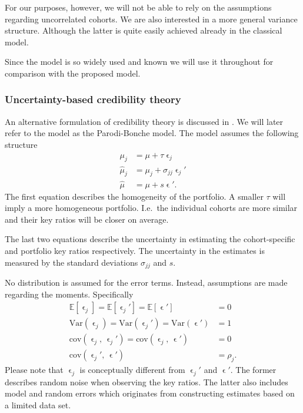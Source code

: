 \documentclass[11pt]{article}
\theoremstyle{definition}
\begin{document}
For our purposes, however, we will not be able to rely on the assumptions regarding uncorrelated cohorts. We are also interested in a more general variance structure. Although the latter is quite easily achieved already in the classical model.

Since the model is so widely used and known we will use it throughout for comparison with the proposed model.

\subsubsection{Uncertainty-based credibility theory}
An alternative formulation of credibility theory is discussed in \cite{parodi}. We will later refer to the model as the Parodi-Bonche model. The model assumes the following structure
\begin{equation*}
    \begin{aligned}
        \mu_j &= \mu + \tau\upvarepsilon_{j} \\
        \hat\mu_j &= \mu_j + \sigma_{jj}\upvarepsilon_j' \\
        \hat\mu &= \mu + s\upvarepsilon'.
    \end{aligned}
\end{equation*}
The first equation describes the homogeneity of the portfolio. A smaller $\tau$ will imply a more homogeneous portfolio. I.e.\ the individual cohorts are more similar and their key ratios will be closer on average.

The last two equations describe the uncertainty in estimating the cohort-specific and portfolio key ratios respectively. The uncertainty in the estimates is measured by the standard deviations $\sigma_{jj}$ and $s$.

No distribution is assumed for the error terms. Instead, assumptions are made regarding the moments. Specifically
\begin{equation*}
    \begin{aligned}
        \mathds{E}[\upvarepsilon_j] = \mathds{E}[\upvarepsilon_j'] = \mathds{E}[\upvarepsilon'] &= 0 \\
        \text{Var}(\upvarepsilon_j) = \text{Var}(\upvarepsilon_j') = \text{Var}(\upvarepsilon') &= 1 \\
        \text{cov}(\upvarepsilon_j,\, \upvarepsilon_j') = \text{cov}(\upvarepsilon_j,\, \upvarepsilon') &= 0 \\
        \text{cov}(\upvarepsilon_j',\, \upvarepsilon') &= \rho_j.
    \end{aligned}
\end{equation*}
Please note that $\upvarepsilon_j$ is conceptually different from $\upvarepsilon_j'$ and $\upvarepsilon'$. The former describes random noise when observing the key ratios. The latter also includes model and random errors which originates from constructing estimates based on a limited data set. 
\end{document}
